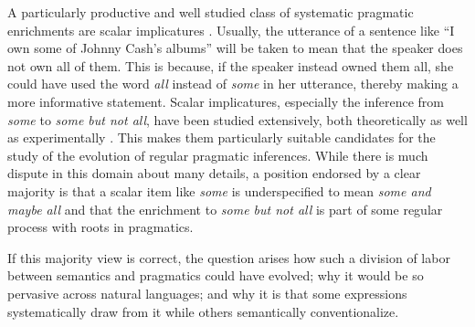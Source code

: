 \documentclass[a4paper, 11pt]{article}
\theoremstyle{Satz}
\begin{document}
A particularly productive and well studied class of systematic pragmatic enrichments are scalar
implicatures
\citep{horn:1984,Hirschberg1985:A-Theory-of-Sca,LevinsonPragmatics1983,Geurts2010:Quantity-Implic}. Usually,
the utterance of a sentence like ``I own some of Johnny Cash's albums'' will be taken to mean
that the speaker does not own all of them. This is because, if the speaker instead owned them all, she
could have used the word \emph{all} instead of \emph{some} in her utterance, thereby making a
more informative statement. Scalar implicatures, especially the inference from \emph{some} to
\emph{some but not all}, have been studied extensively, both theoretically
\citep[e.g.,][]{Sauerland2004:Scalar-Implicat,ChierchiaFox2008:The-Grammatical,Rooyvan-RooijJagerde-Jager2012:Explaining-Quan}
as well as experimentally
\citep[e.g.,][]{BottNoveck2004:Some-Utterances,huang+snedeker:2009,GrodnerKlein2010:Some-and-Possib,GoodmanStuhlmuller2013:Knowledge-and-I,DegenTanenhaus2012:Processing-Scal}. This makes them particularly suitable candidates for the study of the evolution of regular pragmatic inferences.  While there is much dispute in this domain about many details, a position endorsed by a clear majority is that a scalar item like \emph{some} is underspecified to mean \emph{some and maybe all} and that the enrichment to \emph{some but not all} is part of some regular process with
roots in pragmatics.

If this majority view is correct, the question arises how such a division of labor between
semantics and pragmatics could have evolved; why it would be so pervasive across natural
languages; and why it is that some expressions systematically draw from it while others semantically conventionalize. 
\end{document}
